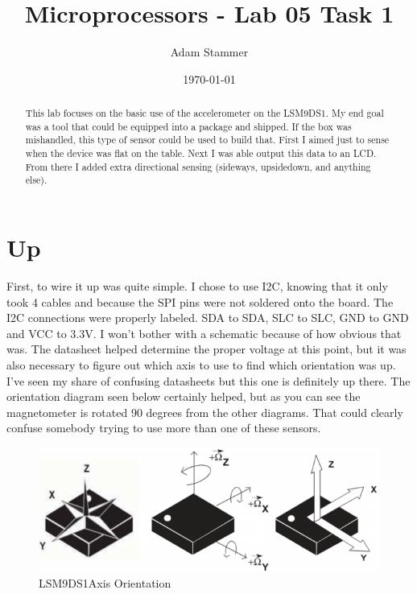 \documentclass[prb,preprint]{revtex4-1}
\newcommand{\dev}{LSM9DS1} %
\begin{document}
\title{Microprocessors - Lab 05 Task 1}
\author{Adam Stammer}

\date{\today}

\begin{abstract}
This lab focuses on the basic use of the accelerometer on the LSM9DS1. My end goal was a tool that could be equipped into a package and shipped. If the box was mishandled, this type of sensor could be used to build that. First I aimed just to sense when the device was flat on the table. Next I was able output this data to an LCD. From there I added extra directional sensing (sideways, upsidedown, and anything else).
\end{abstract}

\maketitle




\section{Up}
First, to wire it up was quite simple. I chose to use I2C, knowing that it only took 4 cables and because the SPI pins were not soldered onto the board. The I2C connections were properly labeled. SDA to SDA, SLC to SLC, GND to GND and VCC to 3.3V. I won't bother with a schematic because of how obvious that was. The datasheet helped determine the proper voltage at this point, but it was also necessary to figure out which axis to use to find which orientation was up. I've seen my share of confusing datasheets but this one is definitely up there. The orientation diagram seen below certainly helped, but as you can see the magnetometer is rotated 90 degrees from the other diagrams. That could clearly confuse somebody trying to use more than one of these sensors.

\begin{figure}[H]
	\centering
	\includegraphics[width=5.75in]{axes.png}
	\caption{\dev Axis Orientation}
	\label{fig1}
\end{figure}
\end{document}
